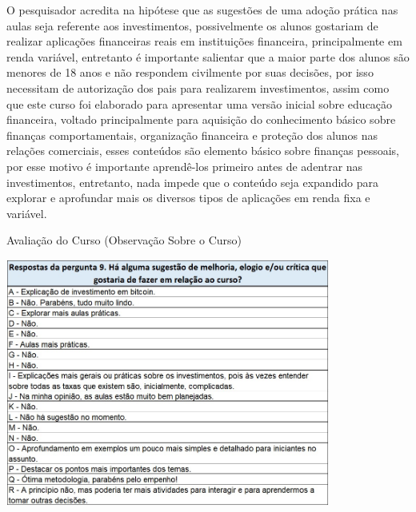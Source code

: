O pesquisador acredita na hipótese que as sugestões de uma adoção prática nas aulas seja referente aos investimentos, possivelmente os alunos gostariam de realizar aplicações financeiras reais em instituições financeira, principalmente em renda variável, entretanto é importante salientar que a maior parte dos alunos são menores de 18 anos e não respondem civilmente por suas decisões, por isso necessitam de autorização dos pais para realizarem investimentos, assim como que este curso foi elaborado para apresentar uma versão inicial sobre educação financeira, voltado principalmente para aquisição do conhecimento básico sobre finanças comportamentais, organização financeira e proteção dos alunos nas relações comerciais, esses conteúdos são elemento básico sobre finanças pessoais, por esse motivo é importante aprendê-los primeiro antes de adentrar nas investimentos, entretanto, nada impede que o conteúdo seja expandido para explorar e aprofundar mais os diversos tipos de aplicações em renda fixa e variável.

\graphicspath{{quadros/}} 
\begin{quadro}[!ht]
\centering
\begin{minipage}{0.80\textwidth}
\caption{Avaliação do Curso (Observação Sobre o Curso)}
\centering
\includegraphics[width=0.80\textwidth]{quadro-31-observação}
\label{quad: quadro-31-observação}
\end{minipage}
\end{quadro}


